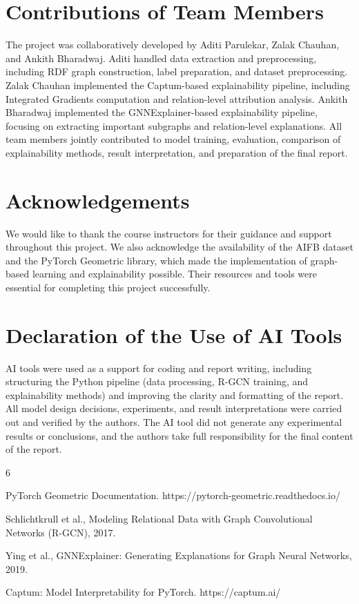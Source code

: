 \documentclass[runningheads]{llncs}
\begin{document}
\section{Contributions of Team Members}

The project was collaboratively developed by Aditi Parulekar, Zalak Chauhan, and Ankith Bharadwaj. Aditi handled data extraction and preprocessing, including RDF graph construction, label preparation, and dataset preprocessing. Zalak Chauhan implemented the Captum-based explainability pipeline, including Integrated Gradients computation and relation-level attribution analysis. Ankith Bharadwaj implemented the GNNExplainer-based explainability pipeline, focusing on extracting important subgraphs and relation-level explanations. All team members jointly contributed to model training, evaluation, comparison of explainability methods, result interpretation, and preparation of the final report.



\section*{Acknowledgements}

We would like to thank the course instructors for their guidance and support throughout this project. We also acknowledge the availability of the AIFB dataset and the PyTorch Geometric library, which made the implementation of graph-based learning and explainability possible. Their resources and tools were essential for completing this project successfully.

\section*{Declaration of the Use of AI Tools}

AI tools were used as a support for coding and report writing, including structuring the Python pipeline (data processing, R-GCN training, and explainability methods) and improving the clarity and formatting of the report. All model design decisions, experiments, and result interpretations were carried out and verified by the authors. The AI tool did not generate any experimental results or conclusions, and the authors take full responsibility for the final content of the report.


\begin{thebibliography}{6}


PyTorch Geometric Documentation. https://pytorch-geometric.readthedocs.io/

Schlichtkrull et al., Modeling Relational Data with Graph Convolutional Networks (R-GCN), 2017.

Ying et al., GNNExplainer: Generating Explanations for Graph Neural Networks, 2019.

Captum: Model Interpretability for PyTorch. https://captum.ai/

\end{thebibliography}
\end{document}

